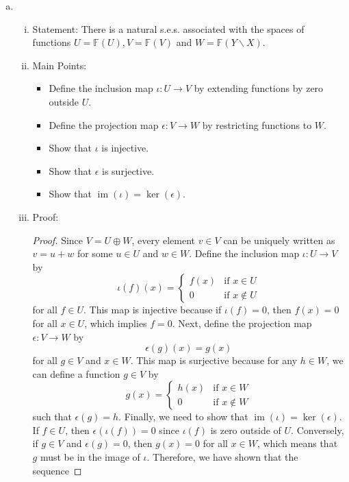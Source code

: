 \documentclass{article}
\begin{document}
\begin{enumerate}[a)]
    \item \begin{enumerate}[i)]
        \item Statement: There is a natural s.e.s. associated with the spaces of functions $U = \mathbb{F}(U), V = \mathbb{F}(V)$ and $W = \mathbb{F}(Y \backslash X)$.
        \item Main Points:
            \begin{itemize}
                \item Define the inclusion map $\iota: U \to V$ by extending functions by zero outside $U$.
                \item Define the projection map $\epsilon: V \to W$ by restricting functions to $W$.
                \item Show that $\iota$ is injective.
                \item Show that $\epsilon$ is surjective.
                \item Show that $\operatorname{im}(\iota) = \ker(\epsilon)$.
            \end{itemize}
        \item Proof:
        \begin{proof}
            Since $V = U \oplus W$, every element $v \in V$ can be uniquely written as $v = u + w$ for some $u \in U$ and $w \in W$. Define the inclusion map $\iota: U \to V$ by
            \[
                \iota(f)(x) = \begin{cases}
                    f(x) & \text{if } x \in U \\
                    0 & \text{if } x \notin U
                \end{cases}
            \]
            for all $f \in U$. This map is injective because if $\iota(f) = 0$, then $f(x) = 0$ for all $x \in U$, which implies $f = 0$. Next, define the projection map $\epsilon: V \to W$ by
            \[
                \epsilon(g)(x) = g(x)
            \]
            for all $g \in V$ and $x \in W$. This map is surjective because for any $h \in W$, we can define a function $g \in V$ by
            \[
                g(x) = \begin{cases}
                    h(x) & \text{if } x \in W \\
                    0 & \text{if } x \notin W
                \end{cases}
            \]
            such that $\epsilon(g) = h$. Finally, we need to show that $\operatorname{im}(\iota) = \ker(\epsilon)$. If $f \in U$, then $\epsilon(\iota(f)) = 0$ since $\iota(f)$ is zero outside of $U$. Conversely, if $g \in V$ and $\epsilon(g) = 0$, then $g(x) = 0$ for all $x \in W$, which means that $g$ must be in the image of $\iota$. Therefore, we have shown that the sequence

\end{proof}
\end{enumerate}
\end{enumerate}
\end{document}
